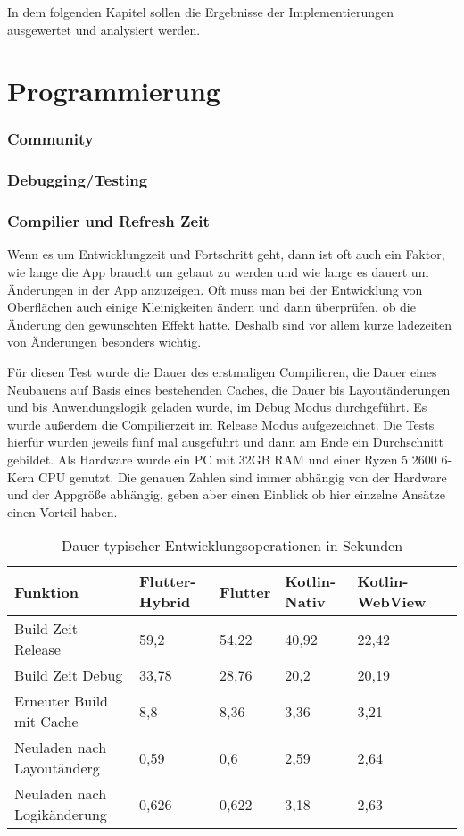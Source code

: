 In dem folgenden Kapitel sollen die Ergebnisse der Implementierungen ausgewertet und analysiert werden. 

\section{Programmierung}
\subsubsection{Community}
\subsubsection{Debugging/Testing}
\subsubsection{Compilier und Refresh Zeit}
Wenn es um Entwicklungzeit und Fortschritt geht, dann ist oft auch ein Faktor, wie lange die App braucht um gebaut zu werden und wie lange es dauert um Änderungen in der App anzuzeigen. Oft muss man bei der Entwicklung von Oberflächen auch einige Kleinigkeiten ändern und dann überprüfen, ob die Änderung den gewünschten Effekt hatte. Deshalb sind vor allem kurze ladezeiten von Änderungen besonders wichtig.

Für diesen Test wurde die Dauer des erstmaligen Compilieren, die Dauer eines Neubauens auf Basis eines bestehenden Caches, die Dauer bis Layoutänderungen und bis Anwendungslogik geladen wurde, im Debug Modus durchgeführt. Es wurde außerdem die Compilierzeit im Release Modus aufgezeichnet.
Die Tests hierfür wurden jeweils fünf mal ausgeführt und dann am Ende ein Durchschnitt gebildet. Als Hardware wurde ein PC mit 32GB RAM und einer Ryzen 5 2600 6-Kern CPU genutzt. 
Die genauen Zahlen sind immer abhängig von der Hardware und der Appgröße abhängig, geben aber einen Einblick ob hier einzelne Ansätze einen Vorteil haben. 

\begin{table}
\centering
\caption{Dauer typischer Entwicklungsoperationen in Sekunden}
\begin{tabular}{ |p{4cm}||p{3cm}|p{2cm}|p{2cm}|p{3cm}|p{3cm}| }
 \hline
 Funktion & Flutter-Hybrid & Flutter & Kotlin-Nativ & Kotlin-WebView \\
 \hline
 Build Zeit Release       &   59,2&   54,22& 40,92& 22,42\\
  \hline
 Build Zeit Debug  & 33,78& 28,76& 20,2& 20,19\\
  \hline
 Erneuter Build mit Cache & 8,8& 8,36& 3,36& 3,21\\
  \hline
 Neuladen nach Layoutänderg & 0,59& 0,6& 2,59& 2,64\\
  \hline
 Neuladen nach Logikänderung & 0,626& 0,622& 3,18& 2,63\\
  \hline
\end{tabular}
\label{tab:evaluations_build_time}
\end{table}

